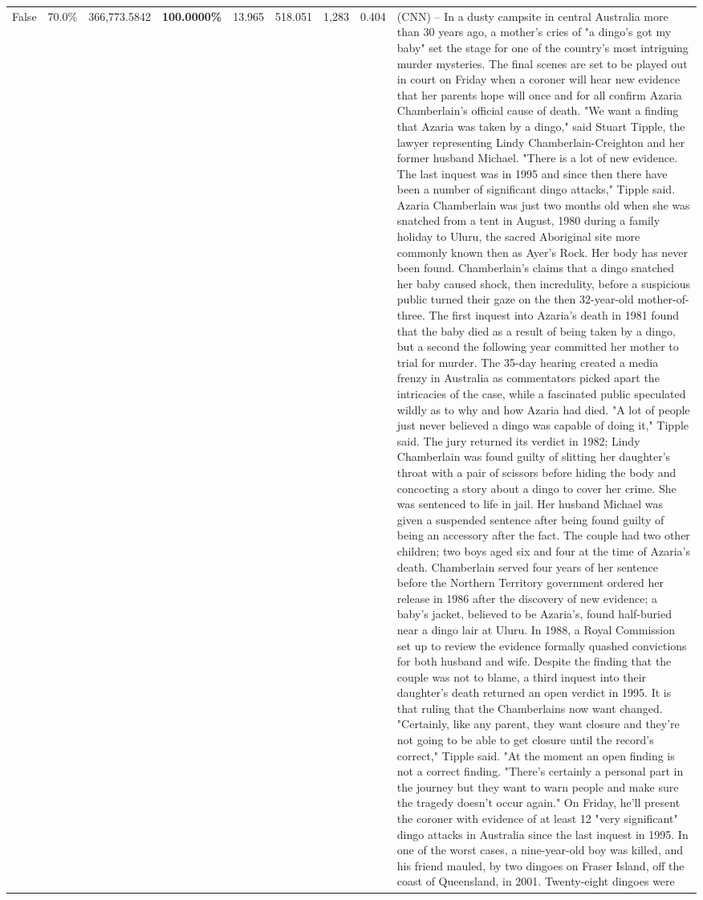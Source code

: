 \begin{table}[H]
\begin{tabular}{lllrlllll}
False & 70.0\% & 366,773.5842 & \bfseries \color{red} 100.0000\% & 13.965 & 518.051 & 1,283 & 0.404 & (CNN) -- In a dusty campsite in central Australia more than 30 years ago, a mother's cries of "a dingo's got my baby" set the stage for one of the country's most intriguing murder mysteries. The final scenes are set to be played out in court on Friday when a coroner will hear new evidence that her parents hope will once and for all confirm Azaria Chamberlain's official cause of death. "We want a finding that Azaria was taken by a dingo," said Stuart Tipple, the lawyer representing Lindy Chamberlain-Creighton and her former husband Michael. "There is a lot of new evidence. The last inquest was in 1995 and since then there have been a number of significant dingo attacks," Tipple said. Azaria Chamberlain was just two months old when she was snatched from a tent in August, 1980 during a family holiday to Uluru, the sacred Aboriginal site more commonly known then as Ayer's Rock. Her body has never been found. Chamberlain's claims that a dingo snatched her baby caused shock, then incredulity, before a suspicious public turned their gaze on the then 32-year-old mother-of-three. The first inquest into Azaria's death in 1981 found that the baby died as a result of being taken by a dingo, but a second the following year committed her mother to trial for murder. The 35-day hearing created a media frenzy in Australia as commentators picked apart the intricacies of the case, while a fascinated public speculated wildly as to why and how Azaria had died. "A lot of people just never believed a dingo was capable of doing it," Tipple said. The jury returned its verdict in 1982; Lindy Chamberlain was found guilty of slitting her daughter's throat with a pair of scissors before hiding the body and concocting a story about a dingo to cover her crime. She was sentenced to life in jail. Her husband Michael was given a suspended sentence after being found guilty of being an accessory after the fact. The couple had two other children; two boys aged six and four at the time of Azaria's death. Chamberlain served four years of her sentence before the Northern Territory government ordered her release in 1986 after the discovery of new evidence; a baby's jacket, believed to be Azaria's, found half-buried near a dingo lair at Uluru. In 1988, a Royal Commission set up to review the evidence formally quashed convictions for both husband and wife. Despite the finding that the couple was not to blame, a third inquest into their daughter's death returned an open verdict in 1995. It is that ruling that the Chamberlains now want changed. "Certainly, like any parent, they want closure and they're not going to be able to get closure until the record's correct," Tipple said. "At the moment an open finding is not a correct finding. "There's certainly a personal part in the journey but they want to warn people and make sure the tragedy doesn't occur again." On Friday, he'll present the coroner with evidence of at least 12 "very significant" dingo attacks in Australia since the last inquest in 1995. In one of the worst cases, a nine-year-old boy was killed, and his friend mauled, by two dingoes on Fraser Island, off the coast of Queensland, in 2001. Twenty-eight dingoes were 
\end{tabular}
\end{table}
